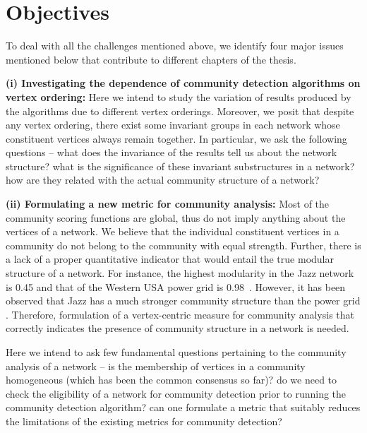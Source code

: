 \section{Objectives}

To deal with all the challenges mentioned above, we identify four major issues mentioned below that contribute to different chapters
of the thesis. 

{\bf (i) Investigating the dependence of community detection algorithms on vertex ordering:} Here we intend to study the variation of
results produced by the algorithms due to different vertex
orderings. Moreover, we posit that despite any vertex ordering, there exist some invariant
groups in each network whose constituent vertices always remain together. In particular, we
ask the following questions -- what does the invariance of the results tell us about the network
structure? what is the significance of these invariant substructures in a network? how are they
related with the actual community structure of a network?


{\bf (ii) Formulating a new metric for community analysis:}
Most of the community scoring functions are global, thus do not imply anything about the vertices of a network. We believe that the
individual constituent vertices in a community do not belong to the community with equal strength. Further, there is a lack of a proper
quantitative indicator that would entail the true
modular structure of a network. For instance, the highest modularity in the Jazz network is
0.45 and that of the Western  USA  power grid is 0.98~\cite{Newman:2006}. However, it has been observed 
 that Jazz has a much stronger community structure than the power grid \cite{Newman:2006}. Therefore, formulation of a vertex-centric
measure for
community analysis that correctly indicates the presence of community structure in a network is needed.

Here we intend to ask few fundamental questions pertaining to the community analysis of a network -- is the membership of vertices in a
community homogeneous (which has been the common consensus so far)? do we need to check the eligibility of a network for community
detection prior to running the community detection algorithm? can one formulate a metric  that suitably reduces the limitations of
the existing metrics for community detection?


